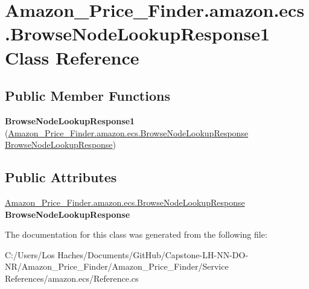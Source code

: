 \hypertarget{class_amazon___price___finder_1_1amazon_1_1ecs_1_1_browse_node_lookup_response1}{\section{Amazon\-\_\-\-Price\-\_\-\-Finder.\-amazon.\-ecs.\-Browse\-Node\-Lookup\-Response1 Class Reference}
\label{class_amazon___price___finder_1_1amazon_1_1ecs_1_1_browse_node_lookup_response1}
}
\subsection*{Public Member Functions}
\begin{DoxyCompactItemize}
\item 
\hypertarget{class_amazon___price___finder_1_1amazon_1_1ecs_1_1_browse_node_lookup_response1_afa240ce95a8a774bd088639dc6a8440e}{{\bfseries Browse\-Node\-Lookup\-Response1} (\hyperlink{class_amazon___price___finder_1_1amazon_1_1ecs_1_1_browse_node_lookup_response}{Amazon\-\_\-\-Price\-\_\-\-Finder.\-amazon.\-ecs.\-Browse\-Node\-Lookup\-Response} \hyperlink{class_amazon___price___finder_1_1amazon_1_1ecs_1_1_browse_node_lookup_response}{Browse\-Node\-Lookup\-Response})}\label{class_amazon___price___finder_1_1amazon_1_1ecs_1_1_browse_node_lookup_response1_afa240ce95a8a774bd088639dc6a8440e}

\end{DoxyCompactItemize}
\subsection*{Public Attributes}
\begin{DoxyCompactItemize}
\item 
\hypertarget{class_amazon___price___finder_1_1amazon_1_1ecs_1_1_browse_node_lookup_response1_a55ec56527e100a5ab86803286b1f85d2}{\hyperlink{class_amazon___price___finder_1_1amazon_1_1ecs_1_1_browse_node_lookup_response}{Amazon\-\_\-\-Price\-\_\-\-Finder.\-amazon.\-ecs.\-Browse\-Node\-Lookup\-Response} {\bfseries Browse\-Node\-Lookup\-Response}}\label{class_amazon___price___finder_1_1amazon_1_1ecs_1_1_browse_node_lookup_response1_a55ec56527e100a5ab86803286b1f85d2}

\end{DoxyCompactItemize}


The documentation for this class was generated from the following file\-:\begin{DoxyCompactItemize}
\item 
C\-:/\-Users/\-Los Haches/\-Documents/\-Git\-Hub/\-Capstone-\/\-L\-H-\/\-N\-N-\/\-D\-O-\/\-N\-R/\-Amazon\-\_\-\-Price\-\_\-\-Finder/\-Amazon\-\_\-\-Price\-\_\-\-Finder/\-Service References/amazon.\-ecs/Reference.\-cs\end{DoxyCompactItemize}

